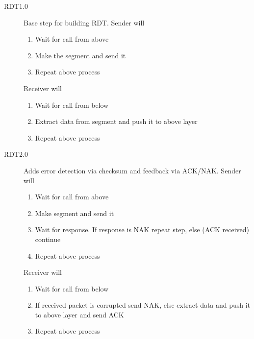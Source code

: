\documentclass{article}
\begin{document}
\begin{description}
    \item[RDT1.0] Base step for building RDT. Sender will
    \begin{enumerate}
        \item Wait for call from above
        \item Make the segment and send it
        \item Repeat above process
    \end{enumerate}
    Receiver will
    \begin{enumerate}
        \item Wait for call from below
        \item Extract data from segment and push it to above layer
        \item Repeat above process
    \end{enumerate}
    
    \item[RDT2.0] Adds error detection via checksum and feedback via ACK/NAK. Sender will
    \begin{enumerate}
        \item Wait for call from above
        \item Make segment and send it
        \item Wait for response. If response is NAK repeat step, else (ACK received) continue
        \item Repeat above process
    \end{enumerate}
    Receiver will
    \begin{enumerate}
        \item Wait for call from below
        \item If received packet is corrupted send NAK, else extract data and push it to above layer 
        and send ACK
        \item Repeat above process
    \end{enumerate}
    

\end{description}
\end{document}
